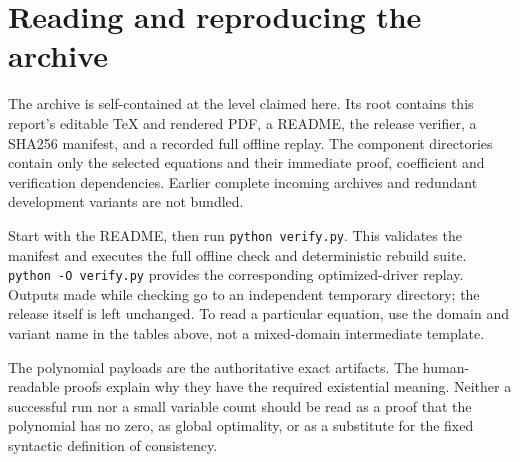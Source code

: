 \documentclass[11pt]{article}
\begin{document}
\section{Reading and reproducing the archive}
The archive is self-contained at the level claimed here. Its root contains
this report's editable TeX and rendered PDF, a README, the release verifier,
a SHA256 manifest, and a recorded full offline replay. The component
directories contain only the selected equations and their immediate
proof, coefficient and verification dependencies. Earlier complete
incoming archives and redundant development variants are not bundled.

Start with the README, then run \texttt{python verify.py}. This validates
the manifest and executes the full offline check and deterministic
rebuild suite. \texttt{python -O verify.py} provides the corresponding
optimized-driver replay. Outputs made while checking go to an independent
temporary directory; the release itself is left unchanged. To read a
particular equation, use the domain and variant name in the tables above,
not a mixed-domain intermediate template.

The polynomial payloads are the authoritative exact artifacts. The
human-readable proofs explain why they have the required existential
meaning. Neither a successful run nor a small variable count should be
read as a proof that the polynomial has no zero, as global optimality, or
as a substitute for the fixed syntactic definition of consistency.
\end{document}
